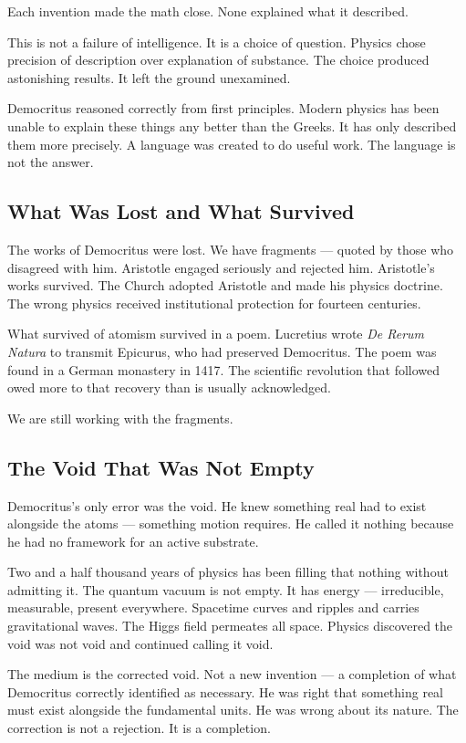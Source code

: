 \documentclass[11pt]{article}
\begin{document}
Each invention made the math close. None explained what it described.

This is not a failure of intelligence. It is a choice of question. Physics chose
precision of description over explanation of substance. The choice produced
astonishing results. It left the ground unexamined.

Democritus reasoned correctly from first principles. Modern physics has been
unable to explain these things any better than the Greeks. It has only described
them more precisely. A language was created to do useful work. The language is
not the answer.

\subsection{What Was Lost and What Survived}
\label{sec:org0d1a0e1}

The works of Democritus were lost. We have fragments — quoted by those who
disagreed with him. Aristotle engaged seriously and rejected him. Aristotle's
works survived. The Church adopted Aristotle and made his physics doctrine. The
wrong physics received institutional protection for fourteen centuries.

What survived of atomism survived in a poem. Lucretius wrote \emph{De Rerum Natura}
to transmit Epicurus, who had preserved Democritus. The poem was found in a
German monastery in 1417. The scientific revolution that followed owed more to
that recovery than is usually acknowledged.

We are still working with the fragments.

\subsection{The Void That Was Not Empty}
\label{sec:org9a5ea00}

Democritus's only error was the void. He knew something real had to exist
alongside the atoms — something motion requires. He called it nothing because he
had no framework for an active substrate.

Two and a half thousand years of physics has been filling that nothing without
admitting it. The quantum vacuum is not empty. It has energy — irreducible,
measurable, present everywhere. Spacetime curves and ripples and carries
gravitational waves. The Higgs field permeates all space. Physics discovered the
void was not void and continued calling it void.

The medium is the corrected void. Not a new invention — a completion of what
Democritus correctly identified as necessary. He was right that something real
must exist alongside the fundamental units. He was wrong about its nature. The
correction is not a rejection. It is a completion.
\end{document}
